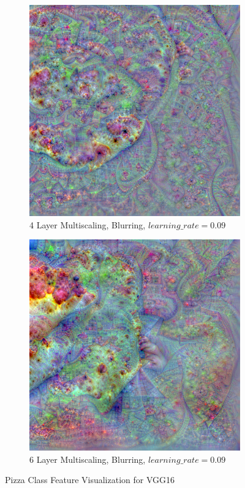\begin{figure}
\begin{subfigure}[t]{0.46\textwidth}
    \end{subfigure}
    \hfill
    \begin{subfigure}[t]{0.46\textwidth}
        \captionsetup{justification=centering}
        \centering
        \includegraphics[width=.7\linewidth]{figuras/feat_vis/experiments/classes/cl963/random_image_ci963_lr9e-2_pl4.png}
        \caption{4 Layer Multiscaling, Blurring, \(learning\_rate = 0.09\)}
    \end{subfigure}
    \hfill
    \begin{subfigure}[t]{0.46\textwidth}
        \captionsetup{justification=centering}
        \centering
        \includegraphics[width=.7\linewidth]{figuras/feat_vis/experiments/classes/cl963/random_image_ci963_lr9e-2_pl6.png}
        \caption{6 Layer Multiscaling, Blurring, \(learning\_rate = 0.09\)}
    \end{subfigure}

    \caption{Pizza Class Feature Visualization for VGG16}
    \label{fig:class_pizza}
\end{figure}

